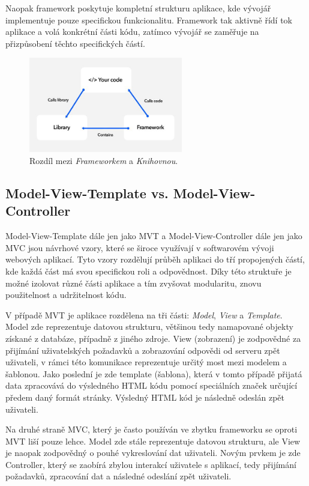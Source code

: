 Naopak framework poskytuje kompletní strukturu aplikace, kde vývojář implementuje pouze specifickou funkcionalitu. Framework tak aktivně řídí tok aplikace a volá konkrétní části kódu, zatímco vývojář se zaměřuje na přizpůsobení těchto specifických částí.

\begin{figure}[H]
    \centering
    \includegraphics[width=0.6\textwidth]{figures/framework_library_difference}
    \caption{Rozdíl mezi \textit{Frameworkem} a \textit{Knihovnou}. \cite{framework_library_difference}}
    \label{fig:framework_library_difference}
\end{figure}

\subsection*{Model-View-Template vs. Model-View-Controller}
Model-View-Template dále jen jako MVT a Model-View-Controller dále jen jako MVC jsou návrhové vzory, které se široce využívají v softwarovém vývoji webových aplikací. Tyto vzory rozdělují průběh aplikaci do tří propojených částí, kde každá část má svou specifickou roli a odpovědnost. Díky této struktuře je možné izolovat různé části aplikace a tím zvyšovat modularitu, znovu použitelnost a udržitelnost kódu.

V případě MVT je aplikace rozdělena na tři části: \textit{Model}, \textit{View} a \textit{Template}. Model zde reprezentuje datovou strukturu, většinou tedy namapované objekty získané z databáze, případně z jiného zdroje. View (zobrazení) je zodpovědné za přijímání uživatelských požadavků a zobrazování odpovědi od serveru zpět uživateli, v rámci této komunikace reprezentuje určitý most mezi modelem a šablonou. Jako poslední je zde template (šablona), která v tomto případě přijatá data zpracovává do výsledného HTML kódu pomocí speciálních značek určující předem daný formát stránky. Výsledný HTML kód je následně odeslán zpět uživateli.

Na druhé straně MVC, který je často používán ve zbytku frameworku se oproti MVT liší pouze lehce. Model zde stále reprezentuje datovou strukturu, ale View je naopak zodpovědný o pouhé vykreslování dat uživateli. Novým prvkem je zde Controller, který se zaobírá zbylou interakcí uživatele s aplikací, tedy přijímání požadavků, zpracování dat a následné odeslání zpět uživateli. \cite{mvc_mvt_difference}

